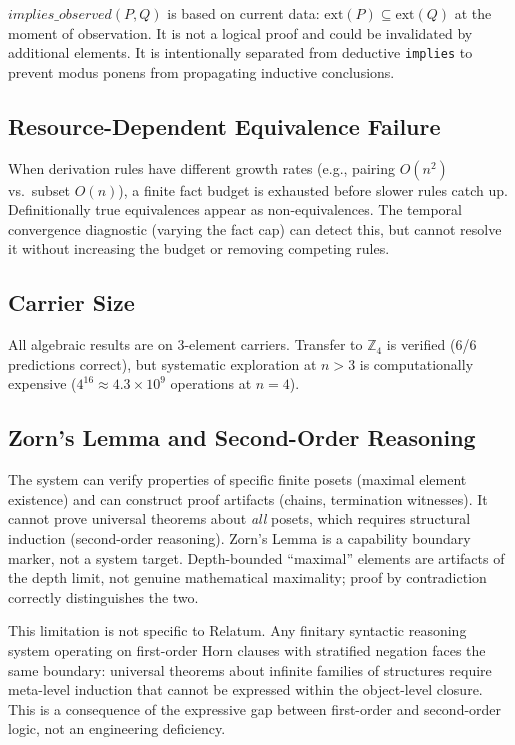 $\mathit{implies\_observed}(P, Q)$ is based on current data: $\mathrm{ext}(P) \subseteq \mathrm{ext}(Q)$ at the moment of observation. It is not a logical proof and could be invalidated by additional elements. It is intentionally separated from deductive \texttt{implies} to prevent modus ponens from propagating inductive conclusions.

\subsection{Resource-Dependent Equivalence Failure}

When derivation rules have different growth rates (e.g., pairing $O(n^2)$ vs.\ subset $O(n)$), a finite fact budget is exhausted before slower rules catch up. Definitionally true equivalences appear as non-equivalences. The temporal convergence diagnostic (varying the fact cap) can detect this, but cannot resolve it without increasing the budget or removing competing rules.

\subsection{Carrier Size}

All algebraic results are on 3-element carriers. Transfer to $\mathbb{Z}_4$ is verified (6/6 predictions correct), but systematic exploration at $n > 3$ is computationally expensive ($4^{16} \approx 4.3 \times 10^9$ operations at $n = 4$).

\subsection{Zorn's Lemma and Second-Order Reasoning}

The system can verify properties of specific finite posets (maximal element existence) and can construct proof artifacts (chains, termination witnesses). It cannot prove universal theorems about \emph{all} posets, which requires structural induction (second-order reasoning). Zorn's Lemma is a capability boundary marker, not a system target. Depth-bounded ``maximal'' elements are artifacts of the depth limit, not genuine mathematical maximality; proof by contradiction correctly distinguishes the two.

This limitation is not specific to Relatum. Any finitary syntactic reasoning system operating on first-order Horn clauses with stratified negation faces the same boundary: universal theorems about infinite families of structures require meta-level induction that cannot be expressed within the object-level closure. This is a consequence of the expressive gap between first-order and second-order logic, not an engineering deficiency.
